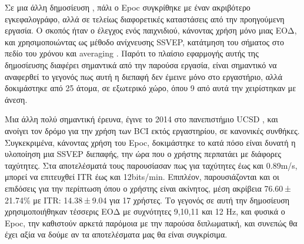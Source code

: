 \documentclass[11pt,a4paper,english,greek,twoside]{../Thesis}
\begin{document}
\par Σε μια άλλη δημοσίευση \cite{noauthor_undated-vk}, πάλι ο Epoc συγκρίθηκε με έναν ακριβότερο εγκεφαλογράφο, αλλά σε τελείως διαφορετικές καταστάσεις από την προηγούμενη εργασία. Ο σκοπός ήταν ο έλεγχος ενός παιχνιδιού, κάνοντας χρήση μόνο μιας ΕΟΔ, και χρησιμοποιώντας ως μέθοδο ανίχνευσης SSVEP, κατάτμηση του σήματος στο πεδίο του χρόνου και averaging \cite{Friman2007-xm}. Παρότι το πλαίσιο εφαρμογής αυτής της δημοσίευσης διαφέρει σημαντικά από την παρούσα εργασία, είναι σημαντικό να αναφερθεί το γεγονός πως αυτή η διεπαφή δεν έμεινε μόνο στο εργαστήριο, αλλά δοκιμάστηκε από 25 άτομα, σε εξωτερικό χώρο, όπου 9 από αυτά την χειρίστηκαν με άνεση.



\par Μια άλλη πολύ σημαντική έρευνα, έγινε το 2014 στο πανεπιστήμιο UCSD \cite{Lin2014-cp}, και ανοίγει τον δρόμο για την χρήση των BCI εκτός εργαστηρίου, σε κανονικές συνθήκες. Συγκεκριμένα, κάνοντας χρήση του Epoc, δοκιμάστηκε το κατά πόσο είναι δυνατή η υλοποίηση μια SSVEP διεπαφής, την ώρα που ο χρήστης περπατάει με διάφορες ταχύτητες. Στα αποτελέσματά τους παρουσίασαν πως για ταχύτητες έως και 0.89m/s, μπορεί να επιτευχθεί ITR έως και 12bits/min. Επιπλέον, παρουσιάζονται και οι επιδόσεις για την περίπτωση όπου ο χρήστης είναι ακίνητος, μέση ακρίβεια 76.60 ± 21.74\% με ITR: 14.38 ± 9.04 για 17 χρήστες.
Το γεγονός σε αυτή την δημοσίευση χρησιμοποιήθηκαν τέσσερις ΕΟΔ με συχνότητες 9,10,11 και 12 Hz, και φυσικά ο Epoc, την καθιστούν αρκετά παρόμοια με την παρούσα διπλωματική, και συνεπώς θα έχει αξία να δούμε αν τα αποτελέσματα μας θα είναι συγκρίσιμα.
\end{document}
